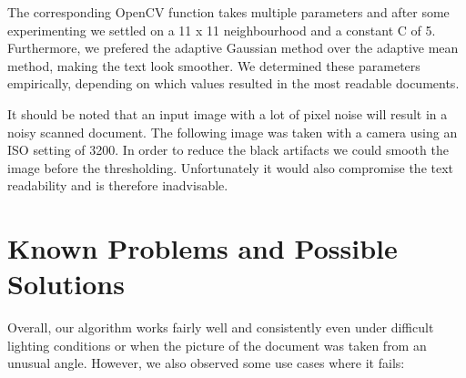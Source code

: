 \documentclass[bibliography=totoc]{scrartcl}
\begin{document}
	The corresponding OpenCV function takes multiple parameters and after some experimenting we settled on a 11 x 11 neighbourhood and a constant C of 5. 
	Furthermore, we prefered the adaptive Gaussian method over the adaptive mean method, making the text look smoother.
	We determined these parameters empirically, depending on which values resulted in the most readable documents.

	It should be noted that an input image with a lot of pixel noise will result in a noisy scanned document. 
	The following image was taken with a camera using an ISO setting of 3200.
	In order to reduce the black artifacts we could smooth the image before the thresholding. 
	Unfortunately it would also compromise the text readability and is therefore inadvisable. 

	\section{Known Problems and Possible Solutions}
	Overall, our algorithm works fairly well and consistently even under difficult lighting conditions or when the picture of the document was taken from an unusual angle.
	However, we also observed some use cases where it fails:
\end{document}
